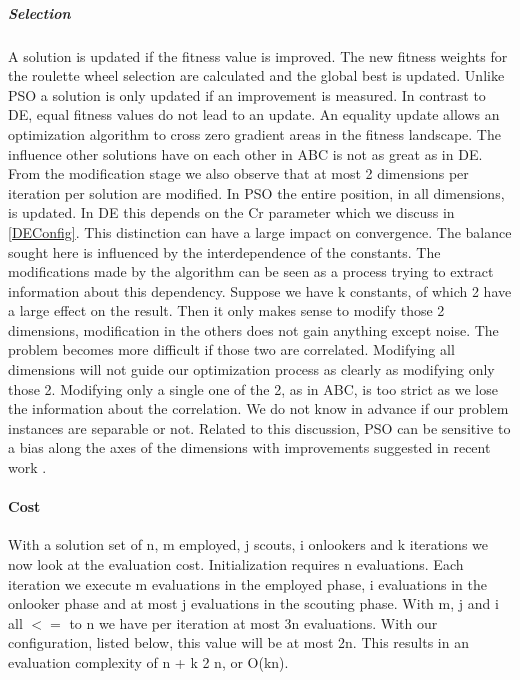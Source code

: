 \subparagraph{Selection}
A solution is updated if the fitness value is improved. The new fitness weights for the roulette wheel selection are calculated and the global best is updated. Unlike PSO a solution is only updated if an improvement is measured. In contrast to DE, equal fitness values do not lead to an update. An equality update allows an optimization algorithm to cross zero gradient areas in the fitness landscape. The influence other solutions have on each other in ABC is not as great as in DE. From the modification stage we also observe that at most 2 dimensions per iteration per solution are modified. In PSO the entire position, in all dimensions, is updated. In DE this depends on the Cr parameter which we discuss in \ref{DEConfig}. This distinction can have a large impact on convergence. The balance sought here is influenced by the interdependence of the constants. The modifications made by the algorithm can be seen as a process trying to extract information about this dependency. Suppose we have k constants, of which 2 have a large effect on the result. Then it only makes sense to modify those 2 dimensions, modification in the others does not gain anything except noise. The problem becomes more difficult if those two are correlated. Modifying all dimensions will not guide our optimization process as clearly as modifying only those 2. Modifying only a single one of the 2, as in ABC, is too strict as we lose the information about the correlation.
We do not know in advance if our problem instances are separable or not. Related to this discussion, PSO can be sensitive to a bias along the axes of the dimensions \cite{PSOBias} with improvements suggested in recent work \cite{PSOBiasAlg}.


\paragraph{Cost}\label{abccost}
With a solution set of n, m employed, j scouts, i onlookers and k iterations we now look at the evaluation cost.
Initialization requires n evaluations. Each iteration we execute m evaluations in the employed phase, i evaluations in the onlooker phase and at most j evaluations in the scouting phase. With m, j and i all $<=$ to n we have per iteration at most 3n evaluations. With our configuration, listed below, this value will be at most 2n. This results in an evaluation complexity of n + k 2 n, or O(kn).

